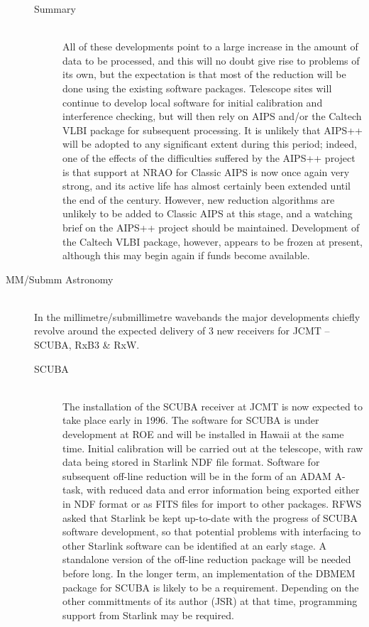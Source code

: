 \begin{description}
\begin{description}
\item[Summary]\mbox{}\\
All of these developments point to a large increase in the amount of
data to be processed, and this will no doubt give rise to problems of
its own, but the expectation is that most of the reduction will be
done using the existing software packages.  Telescope sites will
continue to develop local software for initial calibration and
interference checking, but will then rely on AIPS and/or the Caltech
VLBI package for subsequent processing. It is unlikely that AIPS++
will be adopted to any significant extent during this period; indeed,
one of the effects of the difficulties suffered by the AIPS++ project
is that support at NRAO for Classic AIPS is now once again very
strong, and its active life has almost certainly been extended until
the end of the century. However, new reduction algorithms are unlikely
to be added to Classic AIPS at this stage, and a watching brief on the
AIPS++ project should be maintained. Development of the Caltech VLBI
package, however, appears to be frozen at present, although this may
begin again if funds become available.

\end{description}

\item[MM/Submm Astronomy]\mbox{}\\
In the millimetre/submillimetre wavebands the major developments
chiefly revolve around the expected delivery of 3 new receivers for
JCMT -- SCUBA, RxB3 \& RxW.

\begin{description}
\item[SCUBA]\mbox{}\\
The installation of the SCUBA receiver at JCMT is now expected to take
place early in 1996. The software for SCUBA is under development at
ROE and will be installed in Hawaii at the same time. Initial
calibration will be carried out at the telescope, with raw data being
stored in Starlink NDF file format. Software for subsequent off-line
reduction will be in the form of an ADAM A-task, with reduced data and
error information being exported either in NDF format or as FITS files
for import to other packages. RFWS asked that Starlink be kept
up-to-date with the progress of SCUBA software development, so that
potential problems with interfacing to other Starlink software can be
identified at an early stage. A standalone version of the off-line
reduction package will be needed before long. In the longer term, an
implementation of the DBMEM package for SCUBA is likely to be a
requirement. Depending on the other committments of its author (JSR)
at that time, programming support from Starlink may be required.


\end{description}
\end{description}
